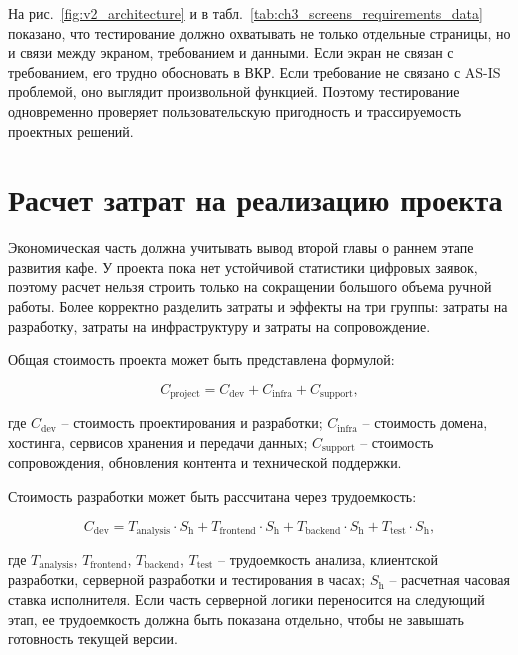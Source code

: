 На рис.~\ref{fig:v2_architecture} и в табл.~\ref{tab:ch3_screens_requirements_data} показано, что тестирование должно охватывать не только отдельные страницы, но и связи между экраном, требованием и данными. Если экран не связан с требованием, его трудно обосновать в ВКР. Если требование не связано с AS-IS проблемой, оно выглядит произвольной функцией. Поэтому тестирование одновременно проверяет пользовательскую пригодность и трассируемость проектных решений.

\section{Расчет затрат на реализацию проекта}

Экономическая часть должна учитывать вывод второй главы о раннем этапе развития кафе. У проекта пока нет устойчивой статистики цифровых заявок, поэтому расчет нельзя строить только на сокращении большого объема ручной работы. Более корректно разделить затраты и эффекты на три группы: затраты на разработку, затраты на инфраструктуру и затраты на сопровождение.

Общая стоимость проекта может быть представлена формулой:

\begin{equation}
C_{\text{project}} = C_{\text{dev}} + C_{\text{infra}} + C_{\text{support}},
\label{eq:ch3_project_cost}
\end{equation}

где \(C_{\text{dev}}\) -- стоимость проектирования и разработки; \(C_{\text{infra}}\) -- стоимость домена, хостинга, сервисов хранения и передачи данных; \(C_{\text{support}}\) -- стоимость сопровождения, обновления контента и технической поддержки.

Стоимость разработки может быть рассчитана через трудоемкость:

\begin{equation}
C_{\text{dev}} = T_{\text{analysis}} \cdot S_{\text{h}} + T_{\text{frontend}} \cdot S_{\text{h}} + T_{\text{backend}} \cdot S_{\text{h}} + T_{\text{test}} \cdot S_{\text{h}},
\label{eq:ch3_dev_cost}
\end{equation}

где \(T_{\text{analysis}}\), \(T_{\text{frontend}}\), \(T_{\text{backend}}\), \(T_{\text{test}}\) -- трудоемкость анализа, клиентской разработки, серверной разработки и тестирования в часах; \(S_{\text{h}}\) -- расчетная часовая ставка исполнителя. Если часть серверной логики переносится на следующий этап, ее трудоемкость должна быть показана отдельно, чтобы не завышать готовность текущей версии.

